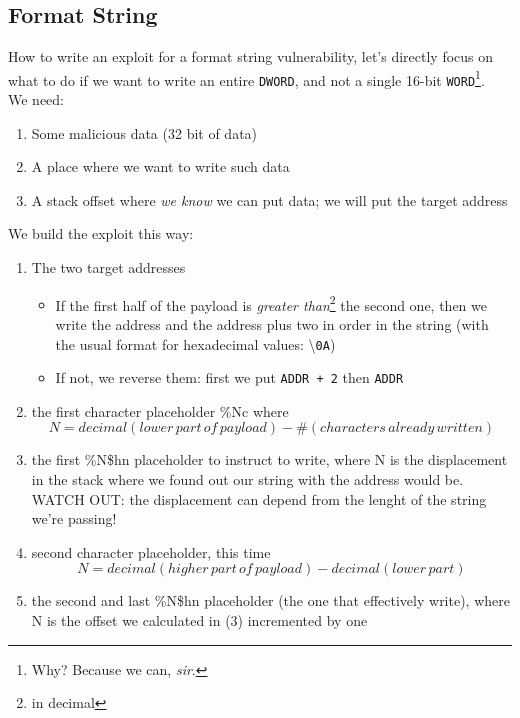 \documentclass{article}
\begin{document}
			\subsection{Format String}
				How to write an exploit for a format string vulnerability, let's directly focus on what to do if we want to write an entire \verb|DWORD|, and not a single 16-bit \verb|WORD|\footnote{Why? Because we can, \textit{sir}.}.\\
				We need:
				\begin{enumerate}
					\item Some malicious data (32 bit of data)
					\item A place where we want to write such data
					\item A stack offset where \textit{we know} we can put data; we will put the target address
				\end{enumerate}
				We build the exploit this way:
				\begin{enumerate}
					\item The two target addresses
						\begin{itemize}
							\item If the first half of the payload is \emph{greater than}\footnote{in decimal} the second one, then we write the address and the address plus two in order in the string (with the usual format for hexadecimal values: \textbackslash \verb|0A|)
							\item If not, we reverse them: first we put \verb|ADDR + 2| then \verb|ADDR|
						\end{itemize}
					\item the first character placeholder \%Nc where 
						\begin{equation}
							N = decimal(lower\, part\, of\, payload) - \#(characters\, already\, written)
						\end{equation}
					\item the first \%N\$hn placeholder to instruct to write, where N is the displacement in the stack where we found out our string with the address would be. WATCH OUT: the displacement can depend from the lenght of the string we're passing!
					\item second character placeholder, this time
						\begin{equation}
							N = decimal(higher\, part\, of\, payload) - decimal(lower\, part)
						\end{equation}
					\item the second and last \%N\$hn placeholder (the one that effectively write), where N is the offset we calculated in (3) incremented by one
				\end{enumerate}
\end{document}
